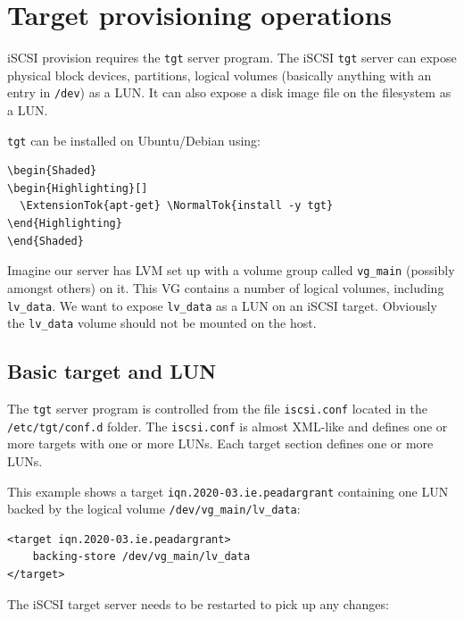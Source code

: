 \section{Target provisioning
operations}\label{target-provisioning-operations}

iSCSI provision requires the \texttt{tgt} server program. The iSCSI
\texttt{tgt} server can expose physical block devices, partitions,
logical volumes (basically anything with an entry in \texttt{/dev}) as a
LUN. It can also expose a disk image file on the filesystem as a LUN.

\texttt{tgt} can be installed on Ubuntu/Debian using:

\begin{verbatim}
\begin{Shaded}
\begin{Highlighting}[]
  \ExtensionTok{apt-get} \NormalTok{install -y tgt}
\end{Highlighting}
\end{Shaded}
\end{verbatim}

Imagine our server has LVM set up with a volume group called
\texttt{vg\_main} (possibly amongst others) on it. This VG contains a
number of logical volumes, including \texttt{lv\_data}. We want to
expose \texttt{lv\_data} as a LUN on an iSCSI target. Obviously the
\texttt{lv\_data} volume should not be mounted on the host.

\subsection{Basic target and LUN}\label{basic-target-and-lun}

The \texttt{tgt} server program is controlled from the file
\texttt{iscsi.conf} located in the \texttt{/etc/tgt/conf.d} folder. The
\texttt{iscsi.conf} is almost XML-like and defines one or more targets
with one or more LUNs. Each target section defines one or more LUNs.

This example shows a target \texttt{iqn.2020-03.ie.peadargrant}
containing one LUN backed by the logical volume
\texttt{/dev/vg\_main/lv\_data}:

\begin{verbatim}
<target iqn.2020-03.ie.peadargrant>
    backing-store /dev/vg_main/lv_data
</target>
\end{verbatim}

The iSCSI target server needs to be restarted to pick up any changes:

